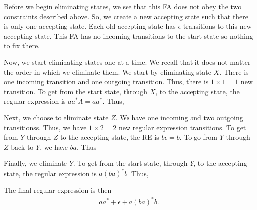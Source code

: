 \documentclass{report}
\begin{document}
\begin{itemize}
        Before we begin eliminating states, we see that this FA does not obey the two constraints described above. So, we create a new accepting state such that there is only one accepting state. Each old accepting state has $\epsilon$ transitions to this new accepting state. This FA has no incoming transitions to the start state so nothing to fix there.
        \bigbreak \noindent 
        \begin{figure}[ht]
            \centering
            \label{fig:re2}
        \end{figure}
        \bigbreak \noindent 
        Now, we start eliminating states one at a time. We recall that it does not matter the order in which we eliminate them.
        \bigbreak \noindent 
        We start by eliminating state $X$. There is one incoming transition and one outgoing transition. Thus, there is $1\times 1 = 1$ new transition. To get from the start state, through $X$, to the accepting state, the regular expression is $aa^{*}\Lambda = aa^{*}$. Thus,
        \bigbreak \noindent 
\begin{figure}[ht]
    \centering
    \label{fig:re3}
\end{figure}
\bigbreak \noindent 
Next, we choose to eliminate state $Z$. We have one incoming and two outgoing transitionss. Thus, we have $1\times 2  = 2$ new regular expression transitions. To get from $Y$ through $Z$ to the accepting state, the RE is $b\epsilon =  b$. To go from $Y$ through $Z$ back to $Y$, we have $ba$. Thus
\bigbreak \noindent 
\begin{figure}[ht]
    \centering
    \label{fig:re4}
\end{figure}
\bigbreak \noindent 
Finally, we eliminate $Y$. To get from the start state, through $Y$, to the accepting state, the regular expression is $a(ba)^{*}b$. Thus, 
\bigbreak \noindent 
\begin{figure}[ht]
    \centering
    \label{fig:re5}
\end{figure}
\bigbreak \noindent 
The final regular expression is then 
\begin{align*}
    aa^{*} + \epsilon + a(ba)^{*}b
.\end{align*}
\blacksquare










    \end{itemize}
\end{document}
